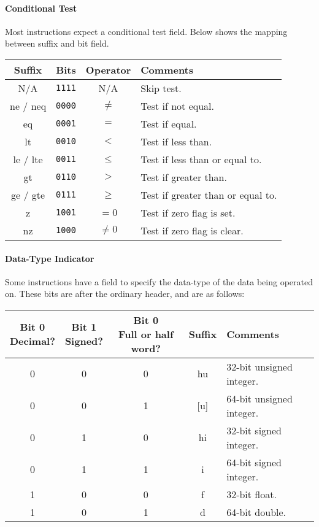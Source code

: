 \documentclass[10pt]{article}
\begin{document}
\paragraph{Conditional Test}
Most instructions expect a conditional test field.
Below shows the mapping between suffix and bit field.

\medskip
\begin{tabular}{|c|c|c|l|}
    \hline
    \textbf{Suffix} & \textbf{Bits} & \textbf{Operator} & \textbf{Comments} \\
    \hline
    N/A & \texttt{1111} & N/A & Skip test. \\
    \hline
    ne / neq & \texttt{0000} & \(\neq\) & Test if not equal. \\
    eq & \texttt{0001} & \(=\) & Test if equal. \\
    \hline
    lt & \texttt{0010} & \(<\) & Test if less than. \\
    le / lte & \texttt{0011} & \(\le\) & Test if less than or equal to. \\
    \hline
    gt & \texttt{0110} & \(>\) & Test if greater than. \\
    ge / gte & \texttt{0111} & \(\ge\) & Test if greater than or equal to. \\
    \hline
    z & \texttt{1001} & \(= 0\) & Test if zero flag is set. \\
    nz & \texttt{1000} & \(\neq 0\) & Test if zero flag is clear. \\
    \hline
\end{tabular}

\paragraph{Data-Type Indicator}
Some instructions have a field to specify the data-type of the data being operated on.
These bits are after the ordinary header, and are as follows:

\bigskip
\begin{tabular}{|c|c|c||c|l|}
    \hline
    \makecell[c]{\textbf{Bit 0}\\Decimal?} & \makecell[c]{\textbf{Bit 1}\\Signed?} & \makecell[c]{\textbf{Bit 0}\\Full or half word?} & \textbf{Suffix} & \textbf{Comments} \\
    \hline
    0 & 0 & 0 & hu & 32-bit unsigned integer. \\
    \hline
    0 & 0 & 1 & [u] & 64-bit unsigned integer. \\
    \hline
    0 & 1 & 0 & hi & 32-bit signed integer. \\
    \hline
    0 & 1 & 1 & i & 64-bit signed integer. \\
    \hline
    1 & 0 & 0 & f & 32-bit float. \\
    \hline
    1 & 0 & 1 & d & 64-bit double. \\
    \hline
\end{tabular}
\end{document}
